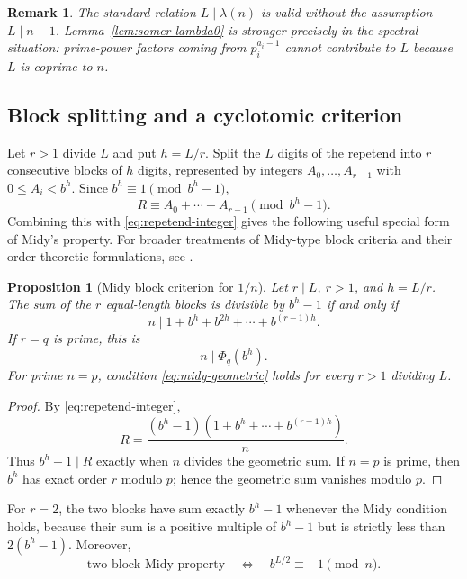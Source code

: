 \documentclass[11pt]{article}
\newtheorem{proposition}[theorem]{Proposition}
\newtheorem{remark}[theorem]{Remark}
\begin{document}
\begin{remark}
The standard relation $L\mid\lambda(n)$ is valid without the assumption
$L\mid n-1$.  Lemma~\ref{lem:somer-lambda0} is stronger precisely in the
spectral situation: prime-power factors coming from $p_i^{a_i-1}$ cannot
contribute to $L$ because $L$ is coprime to $n$.
\end{remark}

\subsection{Block splitting and a cyclotomic criterion}

Let $r>1$ divide $L$ and put $h=L/r$.  Split the $L$ digits of the
repetend into $r$ consecutive blocks of $h$ digits, represented by integers
$A_0,\ldots,A_{r-1}$ with $0\le A_i<b^h$.  Since $b^h\equiv1\pmod{b^h-1}$,
\[
R\equiv A_0+\cdots+A_{r-1}\pmod{b^h-1}.
\]
Combining this with \eqref{eq:repetend-integer} gives the following useful
special form of Midy's property.  For broader treatments of Midy-type block
criteria and their order-theoretic formulations, see
\cite{GuptaSury2005,Lewittes2007,Martin2007,GarciaGiraldo2009}.

\begin{proposition}[Midy block criterion for $1/n$]
\label{prop:midy-block}
Let $r\mid L$, $r>1$, and $h=L/r$.  The sum of the $r$ equal-length
blocks is divisible by $b^h-1$ if and only if
\begin{equation}
n\mid 1+b^h+b^{2h}+\cdots+b^{(r-1)h}.
\label{eq:midy-geometric}
\end{equation}
If $r=q$ is prime, this is
\[
n\mid\Phi_q(b^h).
\]
For prime $n=p$, condition \eqref{eq:midy-geometric} holds for every
$r>1$ dividing $L$.
\end{proposition}

\begin{proof}
By \eqref{eq:repetend-integer},
\[
R=\frac{(b^h-1)(1+b^h+\cdots+b^{(r-1)h})}{n}.
\]
Thus $b^h-1\mid R$ exactly when $n$ divides the geometric sum.  If $n=p$
is prime, then $b^h$ has exact order $r$ modulo $p$; hence the geometric
sum vanishes modulo $p$.
\end{proof}

For $r=2$, the two blocks have sum exactly $b^h-1$ whenever the Midy
condition holds, because their sum is a positive multiple of $b^h-1$ but
is strictly less than $2(b^h-1)$.  Moreover,
\begin{equation}
\text{two-block Midy property}
\quad\Longleftrightarrow\quad
b^{L/2}\equiv-1\pmod n.
\label{eq:midy-minus1}
\end{equation}
\end{document}
